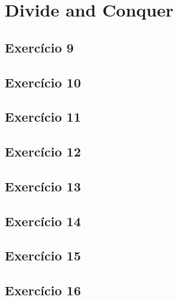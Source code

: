 \section{Divide and Conquer}\label{sec:divide_and_conquer}

\subsection{Exercício 9}\label{sec:exer9}

\subsection{Exercício 10}\label{sec:exer10}

\subsection{Exercício 11}\label{sec:exer11}

\subsection{Exercício 12}\label{sec:exer12}

\subsection{Exercício 13}\label{sec:exer13}

\subsection{Exercício 14}\label{sec:exer14}

\subsection{Exercício 15}\label{sec:exer15}

\subsection{Exercício 16}\label{sec:exer16}
